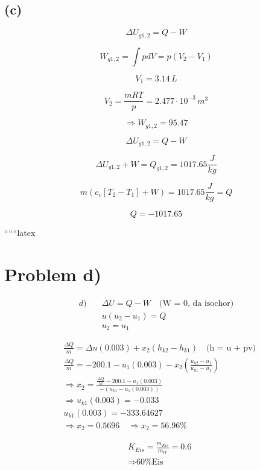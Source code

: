 \subsection*{(c)}

\[
\Delta U_{g1,2} = Q - W
\]

\[
W_{g1,2} = \int p dV = p (V_2 - V_1)
\]

\[
V_1 = 3.14 \, L
\]

\[
V_2 = \frac{mRT}{p} = 2.477 \cdot 10^{-3} \, m^3
\]

\[
\Rightarrow W_{g1,2} = 95.47
\]

\[
\Delta U_{g1,2} = Q - W
\]

\[
\Delta U_{g1,2} + W = Q_{g1,2} = 1017.65 \frac{J}{kg}
\]

\[
m (c_v [T_2 - T_1] + W) = 1017.65 \frac{J}{kg} = Q
\]

\[
Q = -1017.65
\]

``````latex


\section*{Problem d)}

\begin{align*}
d) \quad & \Delta U = Q - W \quad \text{(W = 0, da isochor)} \\
& u \left( u_2 - u_1 \right) = Q \\
& u_2 = u_1
\end{align*}

\begin{align*}
& \frac{\Delta Q}{m} = \Delta u \left( 0.003 \right) + x_2 \left( h_{k2} - h_{k1} \right) \quad \text{(h = u + pv)} \\
& \frac{\Delta Q}{m} = -200.1 - u_1 \left( 0.003 \right) - x_2 \left( \frac{u_{k2} - u_1}{u_{k1} - u_1} \right) \\
& \Rightarrow x_2 = \frac{\frac{\Delta Q}{m} - 200.1 - u_1 \left( 0.003 \right)}{- \left( u_{k1} - u_1 \left( 0.003 \right) \right)} \\
& \Rightarrow u_{k1} \left( 0.003 \right) = -0.033 \\
& u_{k1} \left( 0.003 \right) = -333.64627 \\
& \Rightarrow x_2 = 0.5696 \quad \Rightarrow x_2 = 56.96\%
\end{align*}

\begin{align*}
& K_{Eis} = \frac{m_{Eis}}{m_{W}} = 0.6 \\
& \Rightarrow \text{60\% Eis}
\end{align*}


